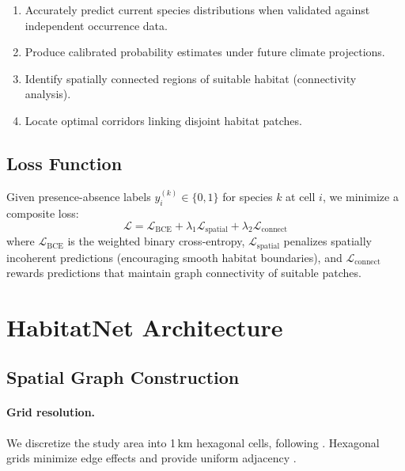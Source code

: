 \documentclass[11pt,a4paper]{article}
\newcommand{\Loss}{\mathcal{L}}
\begin{document}
\begin{enumerate}
  \item Accurately predict current species distributions when validated
    against independent occurrence data.
  \item Produce calibrated probability estimates under future climate
    projections.
  \item Identify spatially connected regions of suitable habitat
    (connectivity analysis).
  \item Locate optimal corridors linking disjoint habitat patches.
\end{enumerate}

\subsection{Loss Function}

Given presence-absence labels $y_i^{(k)} \in \{0, 1\}$ for species $k$
at cell $i$, we minimize a composite loss:
\begin{equation}
  \Loss = \Loss_{\text{BCE}} + \lambda_1 \Loss_{\text{spatial}} +
  \lambda_2 \Loss_{\text{connect}}
  \label{eq:loss}
\end{equation}
where $\Loss_{\text{BCE}}$ is the weighted binary cross-entropy,
$\Loss_{\text{spatial}}$ penalizes spatially incoherent predictions
(encouraging smooth habitat boundaries), and $\Loss_{\text{connect}}$
rewards predictions that maintain graph connectivity of suitable patches.


\section{HabitatNet Architecture}
\label{sec:architecture}

\subsection{Spatial Graph Construction}

\paragraph{Grid resolution.} We discretize the study area into 1\,km
hexagonal cells, following \citet{jetz2019essential}. Hexagonal grids
minimize edge effects and provide uniform adjacency
\citep{birch2007rectangular}.
\end{document}
